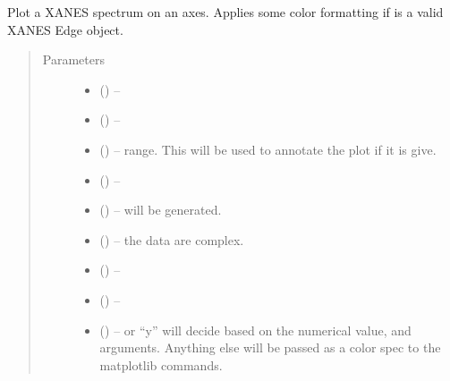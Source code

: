 \documentclass[letterpaper,10pt,english]{sphinxmanual}
\begin{document}
\begin{fulllineitems}
\label{\detokenize{xanespy:xanespy.plots.plot_xanes_spectrum}}
Plot a XANES spectrum on an axes. Applies some color formatting if
 is a valid XANES Edge object.
\begin{quote}\begin{description}
\item[{Parameters}] \leavevmode\begin{itemize}
\item {} 
 (\sphinxstyleliteralemphasis{-}) -- 

\item {} 
 (\sphinxstyleliteralemphasis{-}) -- 

\item {} 
 (\sphinxstyleliteralemphasis{-}) -- range. This will be used to annotate the plot if it is give.

\item {} 
 (\sphinxstyleliteralemphasis{-}) -- 

\item {} 
 (\sphinxstyleliteralemphasis{-}) -- will be generated.

\item {} 
 (\sphinxstyleliteralemphasis{-}) -- the data are complex.

\item {} 
 (\sphinxstyleliteralemphasis{-}) -- 

\item {} 
 (\sphinxstyleliteralemphasis{-}) -- 

\item {} 
 (\sphinxstyleliteralemphasis{-}) -- or ``y'' will decide based on the numerical value,  and
 arguments. Anything else will be passed as a color spec
to the matplotlib commands.

\end{itemize}

\end{description}\end{quote}

\end{fulllineitems}
\end{document}
